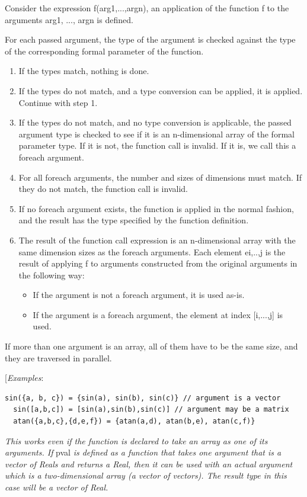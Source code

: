 \documentclass[10pt,a4paper]{report}
\renewcommand{\labelenumi}{\arabic{enumi}.}
\begin{document}
Consider the expression f(arg1,...,argn), an application of the function
f to the arguments arg1, ..., argn is defined.

For each passed argument, the type of the argument is checked against
the type of the corresponding formal parameter of the function.

\begin{enumerate}
\def\labelenumi{\arabic{enumi}.}
\item
  If the types match, nothing is done.
\item
  If the types do not match, and a type conversion can be applied, it is
  applied. Continue with step 1.
\item
  If the types do not match, and no type conversion is applicable, the
  passed argument type is checked to see if it is an n-dimensional array
  of the formal parameter type. If it is not, the function call is
  invalid. If it is, we call this a foreach argument.
\item
  For all foreach arguments, the number and sizes of dimensions must
  match. If they do not match, the function call is invalid.
\item
  If no foreach argument exists, the function is applied in the normal
  fashion, and the result has the type specified by the function
  definition.
\item
  The result of the function call expression is an n-dimensional array
  with the same dimension sizes as the foreach arguments. Each element
  ei,..,j is the result of applying f to arguments constructed from the
  original arguments in the following way:
\begin{itemize}
\item
  If the argument is not a foreach argument, it is used as-is.
\item
  If the argument is a foreach argument, the element at index
  {[}i,...,j{]} is used.
\end{itemize}
\end{enumerate}

If more than one argument is an array, all of them have to be the same
size, and they are traversed in parallel.

{[}\emph{Examples}:

\begin{lstlisting}[language=modelica]
  sin({a, b, c}) = {sin(a), sin(b), sin(c)} // argument is a vector
  sin([a,b,c]) = [sin(a),sin(b),sin(c)] // argument may be a matrix
  atan({a,b,c},{d,e,f}) = {atan(a,d), atan(b,e), atan(c,f)}
\end{lstlisting}
\emph{This works even if the function is declared to take an array as
one of its arguments. If} pval \emph{is defined as a function that takes
one argument that is a vector of Reals and returns a Real, then it can
be used with an actual argument which is a two-dimensional array (a
vector of vectors). The result type in this case will be a vector of
Real. }
\end{document}
